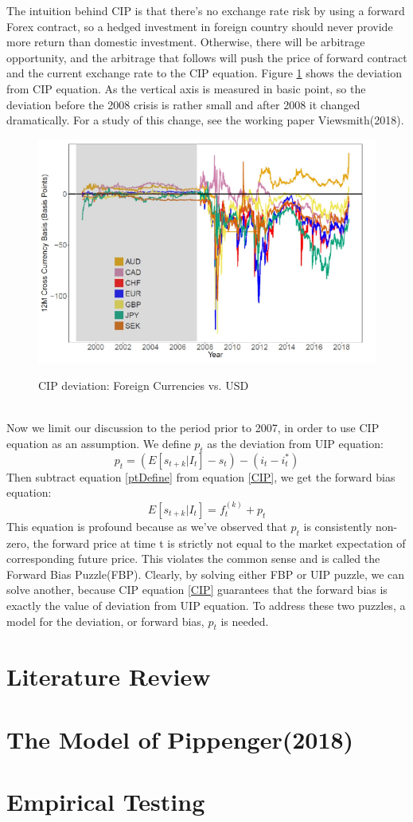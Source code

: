 \documentclass[12pt]{article}
\begin{document}
\indent The intuition behind CIP is that there's no exchange rate risk by using a forward Forex contract, so a hedged investment in foreign country should never provide more return than domestic investment. Otherwise, there will be arbitrage opportunity, and the arbitrage that follows will push the price of forward contract and the current exchange rate to the CIP equation. Figure \ref{CIPdeviation} shows the deviation from CIP equation. As the vertical axis is measured in basic point, so the deviation before the 2008 crisis is rather small and after 2008 it changed dramatically. For a study of this change, see the working paper Viewsmith(2018). \\
\begin{figure}
  \centering
  \includegraphics[scale=1]{CIPdeviation.png}\\
  \caption{CIP deviation: Foreign Currencies vs. USD} \label{CIPdeviation}
\end{figure}
\\
\indent Now we limit our discussion to the period prior to 2007, in order to use CIP equation as an assumption. We define $p_t$ as the deviation from UIP equation:
\begin{equation}
 p_t = (E[s_{t+k}|I_t] - s_t) - (i_t - i^*_t) \label{ptDefine}
\end{equation}
\indent Then subtract equation \ref{ptDefine} from equation \ref{CIP}, we get the forward bias equation:
\begin{equation}
 E[s_{t+k}|I_t] = f_t^{(k)} + p_t \label{forwardBias}
\end{equation}
\indent This equation is profound because as we've observed that $p_t$ is consistently non-zero, the forward price at time t is strictly not equal to the market expectation of corresponding future price. This violates the common sense and is called the Forward Bias Puzzle(FBP). Clearly, by solving either FBP or UIP puzzle, we can solve another, because CIP equation \ref{CIP} guarantees that the forward bias is exactly the value of deviation from UIP equation. To address these two puzzles, a model for the deviation, or forward bias, $p_t$ is needed.
\section{Literature Review}
\section{The Model of Pippenger(2018)}
\section{Empirical Testing}


\end{document}

